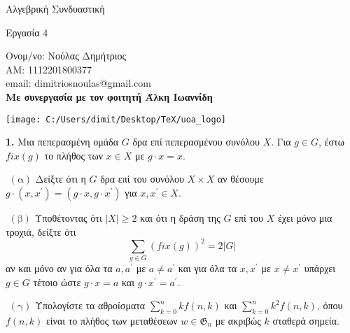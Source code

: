 \documentclass[oneside,a4paper]{article}
\newcommand {\tl}{\textlatin}
\begin{document}
	
	
	\begin{framed}	
		\begin{center}
			\huge Αλγεβρική Συνδυαστική
		\end{center}
		\begin{center}
			\huge Εργασία 4
		\end{center}
		\vspace{0.3truecm}
		\begin{center}
			Ονομ/νο: Νούλας Δημήτριος\\
			ΑΜ: 1112201800377\\
			\tl{email}: \tl{dimitriosnoulas@gmail.com} \\
			\vspace{0.1cm}
			\textbf{Με συνεργασία με τον φοιτητή Άλκη Ιωαννίδη}
		\end{center}
		\vspace{0.3truecm}
	\end{framed}
	\vspace*{\fill}
	\begin{center}
	\texttt{[image: C:/Users/dimit/Desktop/TeX/uoa\_logo]}
	\end{center}
\vspace{1cm}
\pagebreak


\noindent \textbf{1. } Μια πεπερασμένη ομάδα $G$ δρα επί πεπερασμένου συνόλου $X$. Για $g \in G$, έστω $fix(g)$ το πλήθος των $x \in X$ με $g\cdot x = x$.

$ $\newline
$(\text{α})$ Δείξτε ότι η $G$ δρα επί του συνόλου $X \times X$ αν θέσουμε $g \cdot (x,x^{\prime}) = (g \cdot x, g\cdot x^{\prime})$ για $x,x^{\prime} \in X$.

$ $\newline
$(\text{β})$ Υποθέτοντας ότι $|X|\geq 2$ και ότι η δράση της $G$ επί του $X$ έχει μόνο μια τροχιά, δείξτε ότι $$\sum\limits_{g \in G} (fix(g))^2 = 2 |G|$$ αν και μόνο αν για όλα τα $a,a^{\prime}$ με $a\neq a^{\prime}$ και για όλα τα $x,x^{\prime}$ με $x \neq x^{\prime}$ υπάρχει $g \in G$ τέτοιο ώστε $g \cdot x = a$ και $g \cdot x^{\prime} = a^{\prime}$.

$ $\newline
$(\text{γ})$ Υπολογίστε τα αθροίσματα $\sum\limits_{k=0}^n kf(n,k)$ και $\sum\limits_{k=0}^n k^2 f(n,k)$, όπου $f(n,k)$ είναι το πλήθος των μεταθέσεων $w \in \mathfrak{G}_n$ με ακριβώς $k$ σταθερά σημεία.
\end{document}
